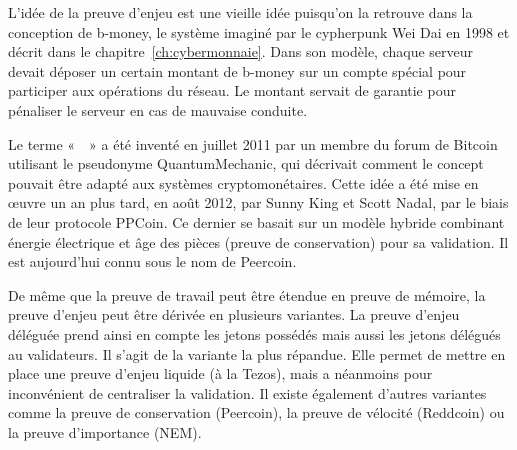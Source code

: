 
L'idée de la preuve d'enjeu est une vieille idée puisqu'on la retrouve dans la conception de b-money, le système imaginé par le cypherpunk Wei Dai en 1998 et décrit dans le chapitre~\ref{ch:cybermonnaie}. Dans son modèle, chaque serveur devait déposer un certain montant de b-money sur un compte spécial pour participer aux opérations du réseau. Le montant servait de garantie pour pénaliser le serveur en cas de mauvaise conduite.

Le terme «~~» a été inventé en juillet 2011 par un membre du forum de Bitcoin utilisant le pseudonyme QuantumMechanic, qui décrivait comment le concept pouvait être adapté aux systèmes cryptomonétaires. Cette idée a été mise en œuvre un an plus tard, en août 2012, par Sunny King et Scott Nadal, par le biais de leur protocole PPCoin. Ce dernier se basait sur un modèle hybride combinant énergie électrique et âge des pièces (preuve de conservation) pour sa validation. Il est aujourd'hui connu sous le nom de Peercoin.

De même que la preuve de travail peut être étendue en preuve de mémoire, la preuve d'enjeu peut être dérivée en plusieurs variantes. La preuve d'enjeu déléguée prend ainsi en compte les jetons possédés mais aussi les jetons délégués au validateurs. Il s'agit de la variante la plus répandue. Elle permet de mettre en place une preuve d'enjeu liquide (à la Tezos), mais a néanmoins pour inconvénient de centraliser la validation. Il existe également d'autres variantes comme la preuve de conservation (Peercoin), la preuve de vélocité (Reddcoin) ou la preuve d'importance (NEM).

